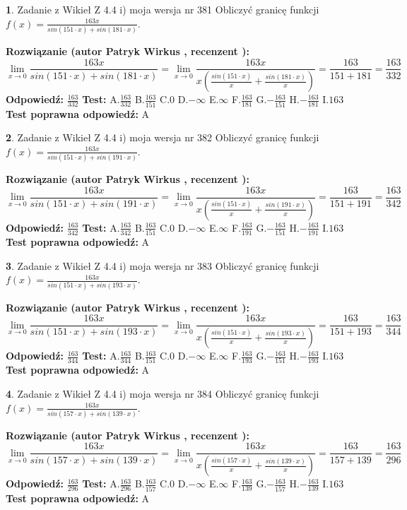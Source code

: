 \documentclass[12pt, a4paper]{article}
\theoremstyle{definition} %
\newtheorem{zad}{}
\newcommand{\zadStart}[1]{\begin{zad}#1\newline}
\newcommand{\zadStop}{\end{zad}}
\newcommand{\rozwStart}[2]{\noindent \textbf{Rozwiązanie (autor #1 , recenzent #2): }\newline}
\newcommand{\rozwStop}{\newline}
\newcommand{\odpStart}{\noindent \textbf{Odpowiedź:}\newline}
\newcommand{\odpStop}{\newline}
\newcommand{\testStart}{\noindent \textbf{Test:}\newline}
\newcommand{\testStop}{\newline}
\newcommand{\kluczStart}{\noindent \textbf{Test poprawna odpowiedź:}\newline}
\newcommand{\kluczStop}{\newline}
\begin{document}
\zadStart{Zadanie z Wikieł Z 4.4 i) moja wersja nr 381}
Obliczyć granicę funkcji $f(x)=\frac{163x}{sin(151\cdot x) +sin(181\cdot x)}$.
\zadStop
\rozwStart{Patryk Wirkus}{}
$$\lim\limits_{x\to 0}\frac{163x}{sin(151\cdot x) +sin(181\cdot x)}=\lim\limits_{x\to 0}\frac{163x}{x(\frac{sin(151\cdot x)}{x}+\frac{sin(181\cdot x)}{x})}=\frac{163}{151+181} = \frac{163}{332}$$
\rozwStop
\odpStart
$\frac{163}{332}$
\odpStop
\testStart
A.$\frac{163}{332}$
B.$\frac{163}{151}$
C.$0$
D.$-\infty$
E.$\infty$
F.$\frac{163}{181}$
G.$-\frac{163}{151}$
H.$-\frac{163}{181}$
I.$163$
\testStop
\kluczStart
A
\kluczStop



\zadStart{Zadanie z Wikieł Z 4.4 i) moja wersja nr 382}
Obliczyć granicę funkcji $f(x)=\frac{163x}{sin(151\cdot x) +sin(191\cdot x)}$.
\zadStop
\rozwStart{Patryk Wirkus}{}
$$\lim\limits_{x\to 0}\frac{163x}{sin(151\cdot x) +sin(191\cdot x)}=\lim\limits_{x\to 0}\frac{163x}{x(\frac{sin(151\cdot x)}{x}+\frac{sin(191\cdot x)}{x})}=\frac{163}{151+191} = \frac{163}{342}$$
\rozwStop
\odpStart
$\frac{163}{342}$
\odpStop
\testStart
A.$\frac{163}{342}$
B.$\frac{163}{151}$
C.$0$
D.$-\infty$
E.$\infty$
F.$\frac{163}{191}$
G.$-\frac{163}{151}$
H.$-\frac{163}{191}$
I.$163$
\testStop
\kluczStart
A
\kluczStop



\zadStart{Zadanie z Wikieł Z 4.4 i) moja wersja nr 383}
Obliczyć granicę funkcji $f(x)=\frac{163x}{sin(151\cdot x) +sin(193\cdot x)}$.
\zadStop
\rozwStart{Patryk Wirkus}{}
$$\lim\limits_{x\to 0}\frac{163x}{sin(151\cdot x) +sin(193\cdot x)}=\lim\limits_{x\to 0}\frac{163x}{x(\frac{sin(151\cdot x)}{x}+\frac{sin(193\cdot x)}{x})}=\frac{163}{151+193} = \frac{163}{344}$$
\rozwStop
\odpStart
$\frac{163}{344}$
\odpStop
\testStart
A.$\frac{163}{344}$
B.$\frac{163}{151}$
C.$0$
D.$-\infty$
E.$\infty$
F.$\frac{163}{193}$
G.$-\frac{163}{151}$
H.$-\frac{163}{193}$
I.$163$
\testStop
\kluczStart
A
\kluczStop



\zadStart{Zadanie z Wikieł Z 4.4 i) moja wersja nr 384}
Obliczyć granicę funkcji $f(x)=\frac{163x}{sin(157\cdot x) +sin(139\cdot x)}$.
\zadStop
\rozwStart{Patryk Wirkus}{}
$$\lim\limits_{x\to 0}\frac{163x}{sin(157\cdot x) +sin(139\cdot x)}=\lim\limits_{x\to 0}\frac{163x}{x(\frac{sin(157\cdot x)}{x}+\frac{sin(139\cdot x)}{x})}=\frac{163}{157+139} = \frac{163}{296}$$
\rozwStop
\odpStart
$\frac{163}{296}$
\odpStop
\testStart
A.$\frac{163}{296}$
B.$\frac{163}{157}$
C.$0$
D.$-\infty$
E.$\infty$
F.$\frac{163}{139}$
G.$-\frac{163}{157}$
H.$-\frac{163}{139}$
I.$163$
\testStop
\kluczStart
A
\kluczStop
\end{document}
